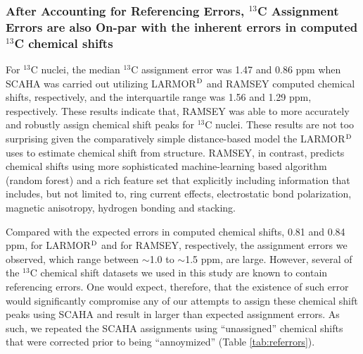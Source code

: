 \documentclass[journal=jcisd8,manuscript=article,layout=onecolumn]{achemso}
\begin{document}
\subsubsection{After Accounting for Referencing Errors, $^{13}$C Assignment Errors are also On-par with the inherent errors in computed $^{13}$C chemical shifts} For $^{13}$C nuclei, the median $^{13}$C assignment error was 1.47 and 0.86 ppm when SCAHA was carried out utilizing LARMOR$^{\rm D}$ and RAMSEY computed chemical shifts, respectively, and the interquartile range was 1.56 and 1.29 ppm, respectively. These results indicate that, RAMSEY was able to more accurately and robustly assign chemical shift peaks for  $^{13}$C nuclei. These results are not too surprising given the comparatively simple distance-based model the LARMOR$^{\rm D}$ uses to estimate chemical shift from structure. RAMSEY, in contrast, predicts chemical shifts using more sophisticated machine-learning based algorithm (random forest) and a rich feature set that explicitly including information that includes, but not limited to, ring current effects, electrostatic bond polarization, magnetic anisotropy, hydrogen bonding and stacking. 

Compared with the expected errors in computed chemical shifts,   0.81 and 0.84 ppm, for LARMOR$^{\rm D}$ and for RAMSEY,  respectively, the assignment errors we observed, which range between $\sim$1.0 to $\sim$1.5 ppm, are large. However, several of the $^{13}$C chemical shift datasets we used in this study are known to contain referencing errors. One would expect, therefore, that the existence of such error would significantly compromise  any of our attempts to assign these chemical shift peaks using SCAHA and result in larger than expected assignment errors.  As such, we repeated the SCAHA assignments using ``unassigned'' chemical shifts that were corrected prior to being ``annoymized'' (Table \ref{tab:referrors}).  
\end{document}

